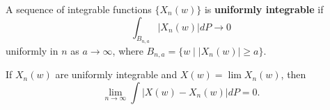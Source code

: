 A sequence of integrable functions $\{X_n(w)\}$ is \textbf{uniformly integrable} if
$$\int_{B_{n,a}} |X_n(w)| dP \to 0$$
uniformly in $n$ as $a \to \infty$, where $B_{n,a} = \{w \mid |X_n(w)| \geq a\}$.

If $X_n(w)$ are uniformly integrable and $X(w) = \lim X_n(w)$, then
$$\lim_{n \to \infty} \int |X(w) - X_n(w)| dP = 0.$$
